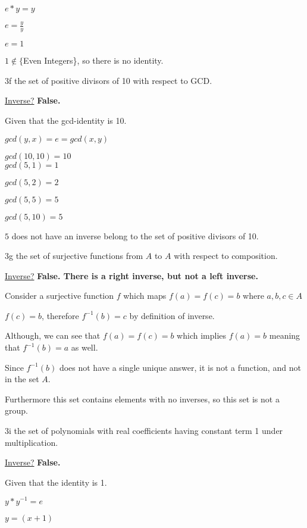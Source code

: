 $e * y = y$

$e = \frac{y}{y}$

$e = 1$

$1 \notin \{$Even Integers\}, so there is no identity.

\begin{question}{3f}
the set of positive divisors of 10 with respect to GCD.
\end{question}

\underline{Inverse?} \textbf{False.}

Given that the gcd-identity is 10.

$gcd(y,x) = e = gcd(x,y)$

$gcd(10,10) = 10$ \\

$gcd(5,1) 	= 1$

$gcd(5,2) 	= 2$

$gcd(5,5) 	= 5$

$gcd(5,10) 	= 5$

$5$ does not have an inverse belong to the set of {positive divisors of 10}. 


\begin{question}{3g}
the set of surjective functions from $A$ to $A$ with respect to composition.
\end{question}

\underline{Inverse?} \textbf{False. There is a right inverse, but not a left inverse.}

Consider a surjective function $f$ which maps $f(a)=f(c)=b$ where $a,b,c \in A$

$f(c)=b$, therefore $f^{-1}(b) = c$ by definition of inverse.

Although, we can see that $f(a)=f(c)=b$ which implies $f(a)=b$ meaning that $f^{-1}(b) = a$ as well.

Since $f^{-1}(b)$ does not have a single unique answer, it is not a function, and not in the set $A$. 

Furthermore this set contains elements with no inverses, so this set is not a group.

\begin{question}{3i}
the set of polynomials with real coefficients having constant term 1 under multiplication.
\end{question}

\underline{Inverse?} \textbf{False.}

Given that the identity is 1.

$y * y^{-1} = e$

$y = (x+1)$

